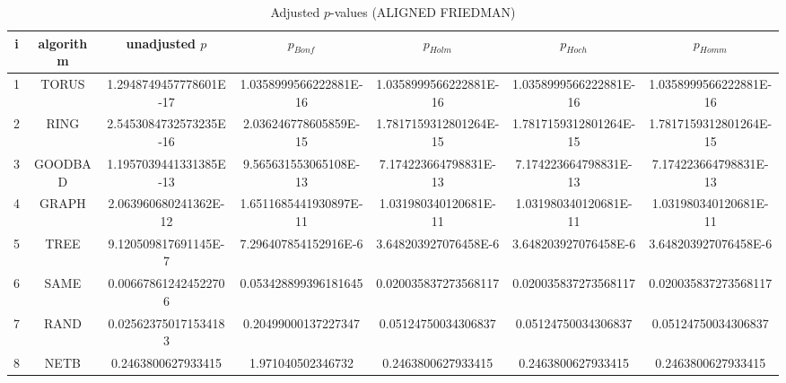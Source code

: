 \documentclass[a4paper,10pt]{article}
\begin{document}
\begin{landscape}
\begin{table}[!htp]
\centering\scriptsize
\caption{Adjusted $p$-values (ALIGNED FRIEDMAN)}
\begin{tabular}{ccccccc}
i&algorithm&unadjusted $p$&$p_{Bonf}$&$p_{Holm}$&$p_{Hoch}$&$p_{Homm}$\\
\hline
1& TORUS&1.2948749457778601E-17&1.0358999566222881E-16&1.0358999566222881E-16&1.0358999566222881E-16&1.0358999566222881E-16\\
2& RING&2.5453084732573235E-16&2.036246778605859E-15&1.7817159312801264E-15&1.7817159312801264E-15&1.7817159312801264E-15\\
3& GOODBAD&1.1957039441331385E-13&9.565631553065108E-13&7.174223664798831E-13&7.174223664798831E-13&7.174223664798831E-13\\
4& GRAPH&2.063960680241362E-12&1.6511685441930897E-11&1.031980340120681E-11&1.031980340120681E-11&1.031980340120681E-11\\
5& TREE&9.120509817691145E-7&7.296407854152916E-6&3.648203927076458E-6&3.648203927076458E-6&3.648203927076458E-6\\
6& SAME&0.006678612424522706&0.053428899396181645&0.020035837273568117&0.020035837273568117&0.020035837273568117\\
7& RAND&0.025623750171534183&0.20499000137227347&0.05124750034306837&0.05124750034306837&0.05124750034306837\\
8& NETB&0.2463800627933415&1.971040502346732&0.2463800627933415&0.2463800627933415&0.2463800627933415\\
\hline
\end{tabular}
\end{table}


\end{landscape}
\end{document}
